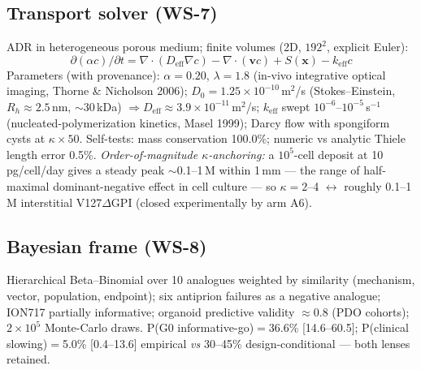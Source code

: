 \documentclass[10pt,twocolumn]{article}
\begin{document}
\subsection{Transport solver (WS-7)}
ADR in heterogeneous porous medium; finite volumes (2D, $192^2$, explicit Euler):
\begin{equation}
\partial(\alpha c)/\partial t=\nabla\!\cdot\!(D_{\text{eff}}\nabla c)-\nabla\!\cdot\!(\mathbf{v}c)+S(\mathbf{x})-k_{\text{eff}}c
\end{equation}
Parameters (with provenance): $\alpha{=}0.20$, $\lambda{=}1.8$ (in-vivo integrative optical imaging, Thorne \& Nicholson 2006); $D_0{=}1.25{\times}10^{-10}$\,m$^2$/s (Stokes--Einstein, $R_h{\approx}2.5$\,nm, $\sim$30\,kDa) $\Rightarrow D_{\text{eff}}{\approx}3.9{\times}10^{-11}$\,m$^2$/s; $k_{\text{eff}}$ swept $10^{-6}$--$10^{-5}$\,s$^{-1}$ (nucleated-polymerization kinetics, Masel 1999); Darcy flow with spongiform cysts at $\kappa\times50$. Self-tests: mass conservation 100.0\%; numeric vs analytic Thiele length error 0.5\%. \emph{Order-of-magnitude $\kappa$-anchoring:} a $10^5$-cell deposit at 10\,pg/cell/day gives a steady peak $\sim$0.1--1\,\textmu M within 1\,mm --- the range of half-maximal dominant-negative effect in cell culture --- so $\kappa{=}2$--4 $\leftrightarrow$ roughly 0.1--1\,\textmu M interstitial V127$\Delta$GPI (closed experimentally by arm A6).

\subsection{Bayesian frame (WS-8)}
Hierarchical Beta--Binomial over 10 analogues weighted by similarity (mechanism, vector, population, endpoint); six antiprion failures as a negative analogue; ION717 partially informative; organoid predictive validity $\approx$0.8 (PDO cohorts); $2{\times}10^5$ Monte-Carlo draws. P(G0 informative-go)$=$36.6\% [14.6--60.5]; P(clinical slowing)$=$5.0\% [0.4--13.6] empirical \emph{vs} 30--45\% design-conditional --- both lenses retained.
\end{document}
